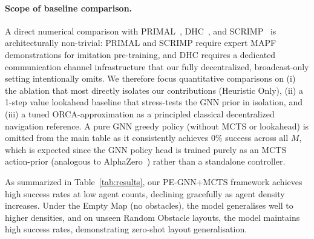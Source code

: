 \documentclass[11pt,a4paper]{article}
\begin{document}
\paragraph{Scope of baseline comparison.}
A direct numerical comparison with PRIMAL~\cite{sartoretti2019primal}, DHC~\cite{ma2021distributed}, and SCRIMP~\cite{wang2023scrimp} is architecturally non-trivial: PRIMAL and SCRIMP require expert MAPF demonstrations for imitation pre-training, and DHC requires a dedicated communication channel infrastructure that our fully decentralized, broadcast-only setting intentionally omits. We therefore focus quantitative comparisons on (i) the ablation that most directly isolates our contributions (Heuristic Only), (ii) a 1-step value lookahead baseline that stress-tests the GNN prior in isolation, and (iii) a tuned ORCA-approximation as a principled classical decentralized navigation reference. A pure GNN greedy policy (without MCTS or lookahead) is omitted from the main table as it consistently achieves $0\%$ success across all $M$, which is expected since the GNN policy head is trained purely as an MCTS action-prior (analogous to AlphaZero~\cite{silver2017mastering}) rather than a standalone controller.

As summarized in Table~\ref{tab:results}, our PE-GNN+MCTS framework achieves high success rates at low agent counts, declining gracefully as agent density increases. Under the Empty Map (no obstacles), the model generalises well to higher densities, and on unseen Random Obstacle layouts, the model maintains high success rates, demonstrating zero-shot layout generalisation.
\end{document}
